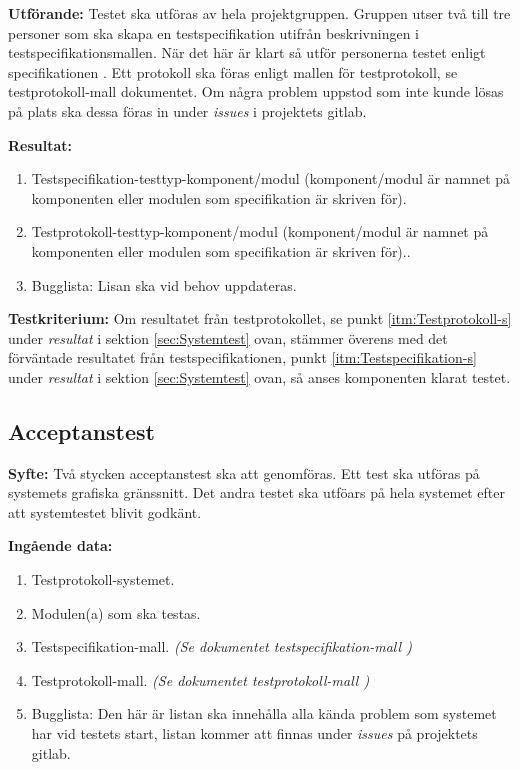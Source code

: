 \documentclass[a4paper,10pt]{article}
\begin{document}
\textbf{Utförande:} Testet ska utföras av hela projektgruppen. Gruppen utser två till tre personer som ska skapa en testspecifikation utifrån beskrivningen i testspecifikationsmallen. När det här är klart så utför personerna testet enligt specifikationen \cite{kravspec}. Ett protokoll ska föras enligt mallen för testprotokoll, se testprotokoll-mall dokumentet. Om några problem uppstod som inte kunde lösas på plats ska dessa föras in under \emph{issues} i projektets gitlab.

\textbf{Resultat:}
    \begin{enumerate}
        \item \label{itm:Testspecifikation-s} Testspecifikation-testtyp-komponent/modul (komponent/modul är namnet på komponenten eller modulen som specifikation är skriven för).
        \item \label{itm:Testprotokoll-s} Testprotokoll-testtyp-komponent/modul (komponent/modul är namnet på komponenten eller modulen som specifikation är skriven för)..
        \item Bugglista: Lisan ska vid behov uppdateras.
    \end{enumerate}

\textbf{Testkriterium:} Om resultatet från testprotokollet, se punkt \ref{itm:Testprotokoll-s} under \emph{resultat} i sektion \ref{sec:Systemtest} ovan, stämmer överens med det förväntade resultatet från testspecifikationen, punkt \ref{itm:Testspecifikation-s} under \emph{resultat} i sektion \ref{sec:Systemtest} ovan, så anses komponenten klarat testet.

\subsection{Acceptanstest}
\textbf{Syfte:}
Två stycken acceptanstest ska att genomföras. Ett test ska utföras på systemets grafiska gränssnitt.  Det andra testet ska utföars på hela systemet efter att systemtestet blivit godkänt.

\textbf{Ingående data:}
        \begin{enumerate}
            \item Testprotokoll-systemet.
            \item Modulen(a) som ska testas.
            \item Testspecifikation-mall. \emph{(Se dokumentet testspecifikation-mall \cite{testspec-mall})}
            \item Testprotokoll-mall. \emph{(Se dokumentet testprotokoll-mall \cite{testprot-mall})}
            \item Bugglista: Den här är listan ska innehålla alla kända problem som systemet har vid testets start, listan kommer att finnas under \emph{issues} på projektets gitlab.
        \end{enumerate}
\end{document}
